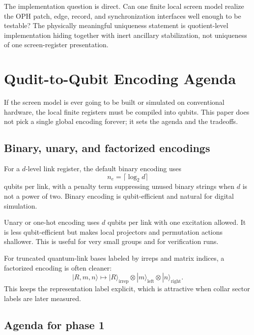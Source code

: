 \documentclass[11pt]{article}
\begin{document}
The implementation question is direct. Can one finite local screen model realize the OPH patch, edge, record, and synchronization interfaces well enough to be testable? The physically meaningful
uniqueness statement is quotient-level implementation hiding together with inert ancillary
stabilization, not uniqueness of one screen-register presentation.

\section{Qudit-to-Qubit Encoding Agenda}

If the screen model is ever going to be built or simulated on conventional hardware, the
local finite registers must be compiled into qubits. This paper does not pick a single global
encoding forever; it sets the agenda and the tradeoffs.

\subsection{Binary, unary, and factorized encodings}

For a $d$-level link register, the default binary encoding uses
\begin{equation}
 n_e = \lceil \log_2 d\rceil
\end{equation}
qubits per link, with a penalty term suppressing unused binary strings when $d$ is not a
power of two. Binary encoding is qubit-efficient and natural for digital simulation.

Unary or one-hot encoding uses $d$ qubits per link with one excitation allowed. It is less
qubit-efficient but makes local projectors and permutation actions shallower. This is useful
for very small groups and for verification runs.

For truncated quantum-link bases labeled by irreps and matrix indices, a factorized encoding
is often cleaner:
\begin{equation}
|R,m,n\rangle \longmapsto |R\rangle_{\mathrm{irrep}}\otimes |m\rangle_{\mathrm{left}}
\otimes |n\rangle_{\mathrm{right}}.
\end{equation}
This keeps the representation label explicit, which is attractive when collar sector labels
are later measured.

\subsection{Agenda for phase 1}
\end{document}
